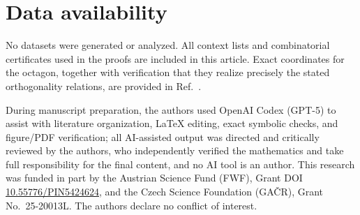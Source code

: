 \documentclass[
  twocolumn,
  aps,
  pra,
  floatfix,
  amsmath,amssymb,
  longbibliography
]{revtex4-2}
\theoremstyle{definition}
\theoremstyle{remark}
\begin{document}
\section*{Data availability} No datasets were generated or analyzed. All context lists and combinatorial certificates used in the proofs are included in this article. Exact coordinates for the octagon, together with verification that they realize precisely the stated orthogonality relations, are provided in Ref.~\cite{2026-Navara-Svozil-complex-only-3d-hypergraphs}.

\begin{acknowledgments}
During manuscript preparation, the authors used OpenAI Codex (GPT-5) to assist with literature organization, LaTeX editing, exact symbolic checks, and figure/PDF verification; all AI-assisted output was directed and critically reviewed by the authors, who independently verified the mathematics and take full responsibility for the final content, and no AI tool is an author.
This research was funded in part by the Austrian
Science Fund (FWF), Grant DOI \href{https://doi.org/10.55776/PIN5424624}{10.55776/PIN5424624}, and the Czech Science
Foundation (GA\v{C}R), Grant No.~25-20013L.  The authors declare no
conflict of interest.
\end{acknowledgments}


\end{document}
